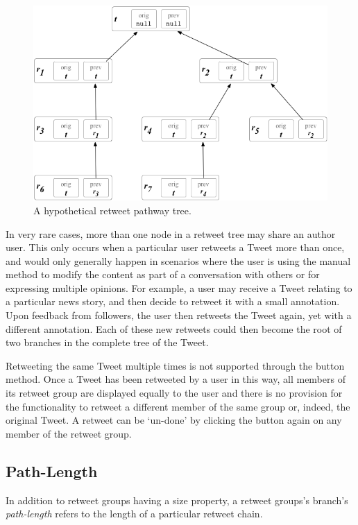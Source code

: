 \begin{figure}[h]
\centering
\includegraphics[scale=0.6]{3.Chapter1/Media/tree.png} 
\caption{A hypothetical retweet pathway tree.}
\label{fig:retweet_tree}
\end{figure}

In very rare cases, more than one node in a retweet tree may share an author user. This only occurs when a particular user retweets a Tweet more than once, and would only generally happen in scenarios where the user is using the manual method to modify the content as part of a conversation with others or for expressing multiple opinions. For example, a user may receive a Tweet relating to a particular news story, and then decide to retweet it with a small annotation. Upon feedback from followers, the user then retweets the Tweet again, yet with a different annotation. Each of these new retweets could then become the root of two branches in the complete tree of the Tweet.

Retweeting the same Tweet multiple times is not supported through the button method. Once a Tweet has been retweeted by a user in this way, all members of its retweet group are displayed equally to the user and there is no provision for the functionality to retweet a different member of the same group or, indeed, the original Tweet. A retweet can be `un-done' by clicking the button again on any member of the retweet group.


\subsection{Path-Length}
In addition to retweet groups having a size property, a retweet groups's branch's \textit{path-length} refers to the length of a particular retweet chain. 

